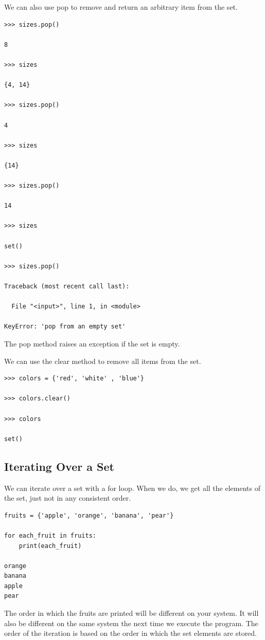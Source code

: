 \documentclass{article}
\begin{document}
We can also use pop to remove and return an arbitrary item from the set.

\begin{lstlisting}
>>> sizes.pop()

8

>>> sizes

{4, 14}

>>> sizes.pop()

4

>>> sizes

{14}

>>> sizes.pop()

14

>>> sizes

set()

>>> sizes.pop()

Traceback (most recent call last):

  File "<input>", line 1, in <module>

KeyError: 'pop from an empty set'
\end{lstlisting}

The pop method raises an exception if the set is empty.

We can use the clear method to remove all items from the set.

\begin{lstlisting}
>>> colors = {'red', 'white' , 'blue'}

>>> colors.clear()

>>> colors

set()
\end{lstlisting}

\subsection{Iterating Over a Set}

We can iterate over a set with a for loop.  When we do, we get all the elements of the set, just not in any consistent order.

\begin{lstlisting}
fruits = {'apple', 'orange', 'banana', 'pear'}

for each_fruit in fruits:
    print(each_fruit)
 
orange
banana
apple
pear
\end{lstlisting}

The order in which the fruits are printed will be different on your system.  It will also be different on the same system the next time we execute the program.  The order of the iteration is based on the order in which the set elements are stored.
\end{document}
